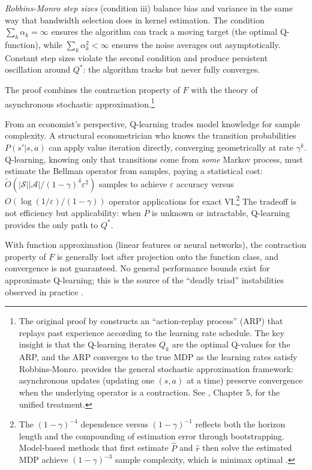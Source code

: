 \emph{Robbins-Monro step sizes} (condition iii) balance bias and variance in the same way that bandwidth selection does in kernel estimation. The condition $\sum_k \alpha_k = \infty$ ensures the algorithm can track a moving target (the optimal Q-function), while $\sum_k \alpha_k^2 < \infty$ ensures the noise averages out asymptotically. Constant step sizes violate the second condition and produce persistent oscillation around $Q^*$: the algorithm tracks but never fully converges.

The proof combines the contraction property of $F$ with the theory of asynchronous stochastic approximation.\footnote{The original proof by \citet{watkins1992_paper} constructs an ``action-replay process'' (ARP) that replays past experience according to the learning rate schedule. The key insight is that the Q-learning iterates $Q_k$ are the optimal Q-values for the ARP, and the ARP converges to the true MDP as the learning rates satisfy Robbins-Monro. \citet{tsitsiklis1994} provides the general stochastic approximation framework: asynchronous updates (updating one $(s,a)$ at a time) preserve convergence when the underlying operator is a contraction. See \citet{bertsekastsitsiklis1996}, Chapter 5, for the unified treatment.}

From an economist's perspective, Q-learning trades model knowledge for sample complexity. A structural econometrician who knows the transition probabilities $P(s'|s,a)$ can apply value iteration directly, converging geometrically at rate $\gamma^k$. Q-learning, knowing only that transitions come from \emph{some} Markov process, must estimate the Bellman operator from samples, paying a statistical cost: $\tilde{O}(|\mathcal{S}||\mathcal{A}|/(1-\gamma)^4\varepsilon^2)$ samples to achieve $\varepsilon$ accuracy versus $O(\log(1/\varepsilon)/(1-\gamma))$ operator applications for exact VI.\footnote{The $(1-\gamma)^{-4}$ dependence versus $(1-\gamma)^{-1}$ reflects both the horizon length and the compounding of estimation error through bootstrapping. Model-based methods that first estimate $\hat{P}$ and $\hat{r}$ then solve the estimated MDP achieve $(1-\gamma)^{-3}$ sample complexity, which is minimax optimal \citep{li2024breaking}.} The tradeoff is not efficiency but applicability: when $P$ is unknown or intractable, Q-learning provides the only path to $Q^*$.

With function approximation (linear features or neural networks), the contraction property of $F$ is generally lost after projection onto the function class, and convergence is not guaranteed. No general performance bounds exist for approximate Q-learning; this is the source of the ``deadly triad'' instabilities observed in practice \citep{Baird1995,bertsekas2019}.

